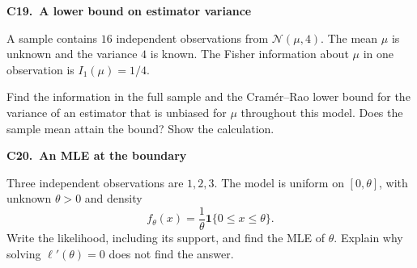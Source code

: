 \documentclass[11pt,a4paper]{article}
\newenvironment{question}[2]{\par\addvspace{10pt}\begin{minipage}{\linewidth}{\sffamily\bfseries\color{Ink}#1.\ #2}\par\vspace{3pt}}{\end{minipage}\par}
\begin{document}
\begin{question}{C19}{A lower bound on estimator variance}
A sample contains $16$ independent observations from $\mathcal N(\mu,4)$.
The mean $\mu$ is unknown and the variance $4$ is known. The Fisher
information about $\mu$ in one observation is $I_1(\mu)=1/4$.

Find the information in the full sample and the Cram\'er--Rao lower bound
for the variance of an estimator that is unbiased for $\mu$ throughout
this model. Does the sample mean attain the bound? Show the calculation.
\end{question}

\begin{question}{C20}{An MLE at the boundary}
Three independent observations are $1,2,3$. The model is uniform on
$[0,\theta]$, with unknown $\theta>0$ and density
\[
f_\theta(x)=\frac1\theta\mathbf1\{0\le x\le\theta\}.
\]
Write the likelihood, including its support, and find the MLE of $\theta$.
Explain why solving $\ell'(\theta)=0$ does not find the answer.
\end{question}
\end{document}
